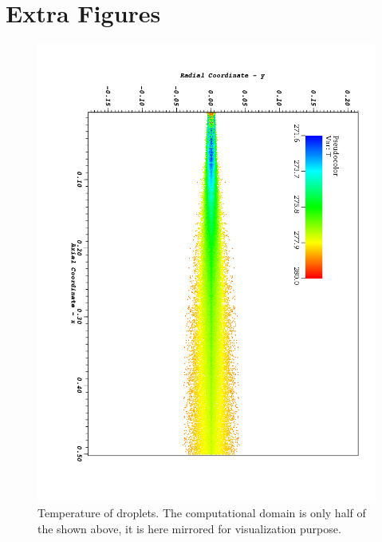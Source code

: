 \section{Extra Figures}\label{appendix 2}
\begin{figure}[h]
 \centering
 \includegraphics[height=0.7\textheight]{./figuras/appA2/visit_Td.png}
 \caption{Temperature of droplets. The computational domain is only half of the shown above, it is here mirrored for visualization purpose.}
 \label{fig: dropT}
\end{figure}

